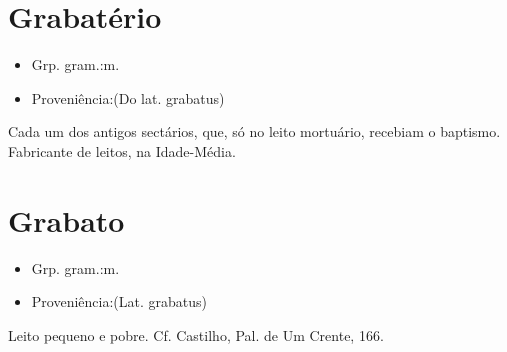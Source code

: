 \section{Grabatério}
\begin{itemize}
\item {Grp. gram.:m.}
\end{itemize}
\begin{itemize}
\item {Proveniência:(Do lat. \textunderscore grabatus\textunderscore )}
\end{itemize}
Cada um dos antigos sectários, que, só no leito mortuário, recebiam o baptismo.
Fabricante de leitos, na Idade-Média.
\section{Grabato}
\begin{itemize}
\item {Grp. gram.:m.}
\end{itemize}
\begin{itemize}
\item {Proveniência:(Lat. \textunderscore grabatus\textunderscore )}
\end{itemize}
Leito pequeno e pobre. Cf. Castilho, \textunderscore Pal. de Um Crente\textunderscore , 166.
